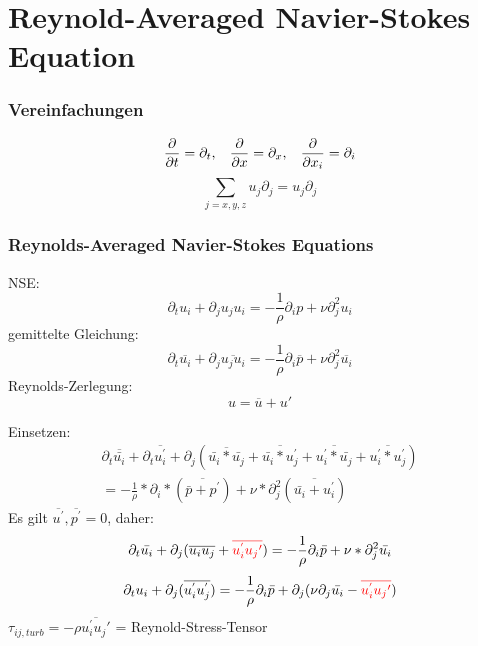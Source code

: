\documentclass[11pt,t]{beamer}
\newcommand*\mean[1]{\overline{#1}}
\begin{document}
\section{Reynold-Averaged Navier-Stokes Equation}


\begin{frame}
	\frametitle{Vereinfachungen}
\begin{equation}
\frac{\partial}{\partial t} = \partial_t, \hspace{0.3 cm}\frac{\partial}{\partial x} = \partial_x,\hspace{0.3 cm} \frac{\partial}{\partial x_i} = \partial_i
\end{equation}
\begin{equation}
\sum_{j=x,y,z}u_j\partial_j = u_j\partial_j
\end{equation}
\end{frame}

\begin{frame}
\frametitle{Reynolds-Averaged Navier-Stokes Equations}
NSE:
\begin{equation}
\partial_t u_i + \partial_j u_ju_i = -\frac{1}{\rho}\partial_i p + \nu\partial^2_j u_i
\end{equation}
gemittelte Gleichung:
\begin{equation}
\partial_t \overline{u_i} + \partial_j \overline{u_ju_i} = -\frac{1}{\rho}\partial_i \overline{p} + \nu\partial^2_j \overline{u_i}
\end{equation}
Reynolds-Zerlegung:
\begin{equation}
u = \overline{u} + u'
\end{equation}
\end{frame}

\begin{frame}
Einsetzen:
\begin{align}
\partial_t \overline{\bar{u_i}} + \partial_t \overline{u_i^{'}}+ \partial_j (\overline{\bar{u_i}*\bar{u_j}} + \overline{\bar{u_i}*u_j^{'}} + \overline{u_i^{'}*\bar{u_j}} + \overline{u_i^{'}*u_j^{'}}) \\
= - \frac{1}{\rho}*\partial_i*(\overline{\bar{p}+p^{'}}) + \nu*\partial_j^2  (\overline{\bar{u_i}+u_i^{'}})
\end{align}
Es gilt $\overline{u^{'}},\overline{p^{'}} = 0$, daher:
\begin{align}
\partial_t \bar{u_i} + \partial_j (\overline{u_iu_j}+{\color{red}\overline{u_i^{'}u_j{'}}}) = - \frac{1}{\rho} \partial_i \bar{p}+\nu*\partial_j^2\bar{u_i}
\end{align}
\begin{align}
\partial_tu_i+\partial_j(\mean{u_i^{'}u_j^{'}}) = - \frac{1}{\rho} \partial_i \bar{p}+\partial_j(\nu\partial_j\bar{u_i}-{\color{red}\overline{u_i^{'}u_j{'}}})
\end{align}
$\tau_{ij,turb} = -\rho\overline{u_i^{'}u_j{'}}$ = Reynold-Stress-Tensor
\end{frame}
\end{document}
